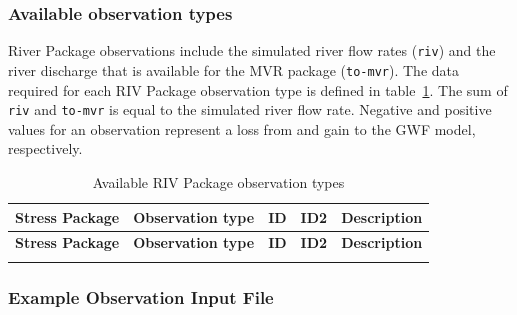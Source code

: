 \vspace{5mm}
\subsubsection{Available observation types}
River Package observations include the simulated river flow rates (\texttt{riv}) and the river discharge that is available for the MVR package (\texttt{to-mvr}). The data required for each RIV Package observation type is defined in table~\ref{table:gwf-rivobstype}. The sum of \texttt{riv} and \texttt{to-mvr} is equal to the simulated river flow rate. Negative and positive values for an observation represent a loss from and gain to the GWF model, respectively.

\begin{longtable}{p{2cm} p{2.75cm} p{2cm} p{1.25cm} p{7cm}}
\caption{Available RIV Package observation types} \tabularnewline

\hline
\hline
\textbf{Stress Package} & \textbf{Observation type} & \textbf{ID} & \textbf{ID2} & \textbf{Description} \\
\hline
\endfirsthead

\hline
\hline
\textbf{Stress Package} & \textbf{Observation type} & \textbf{ID} & \textbf{ID2} & \textbf{Description} \\
\hline
\endhead

\hline
\endfoot


\label{table:gwf-rivobstype}
\end{longtable}

\vspace{5mm}
\subsubsection{Example Observation Input File}

